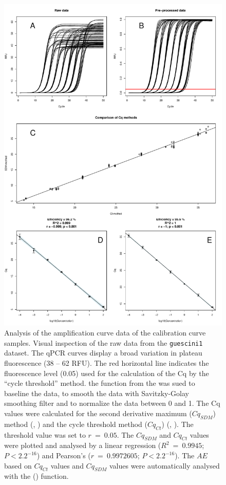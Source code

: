 \begin{figure}[htbp]
  \centering
  \includegraphics[clip=true, width=14cm]{figures/dilution_Cq.pdf}
  \caption{Analysis of the amplification curve data of the calibration curve 
samples.  Visual inspection of the raw data from the \texttt{guescini1} 
dataset. The qPCR curves display a broad variation in plateau fluorescence (38 
-- 62 RFU). The red horizontal line indicates the fluorescence level (0.05) used 
for the calculation of the Cq by the ``cycle threshold'' method.  
the  function from the  was sued to baseline the 
data, to smooth the data with Savitzky-Golay smoothing filter and to normalize 
the data between 0 and 1.  The Cq values were calculated for the 
second derivative maximum ($Cq_{SDM}$) method (, ) 
and the cycle threshold method ($Cq_{Ct}$) (, ). 
The threshold value was set to $r~=~0.05$. The $Cq_{SDM}$ and $Cq_{Ct}$ values 
were plotted and analysed by a linear regression ($R^{2}~=~0.9945$; $P < 
2.2^{-16}$) and Pearson's ($r~=~0.9972605$; $P < 2.2^{-16}$). The $AE$ based on 
 $Cq_{Ct}$ values and  $Cq_{SDM}$ values were 
automatically analysed with the  () function.}
  \label{figure:dilution_Cq}
\end{figure}

